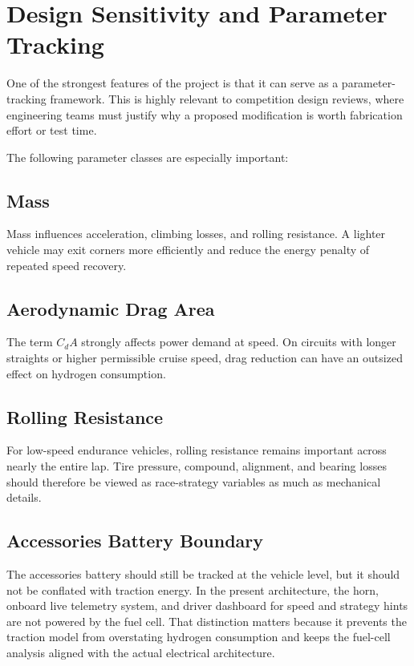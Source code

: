 \documentclass[11pt]{article}
\begin{document}
\section{Design Sensitivity and Parameter Tracking}

One of the strongest features of the project is that it can serve as a parameter-tracking framework. This is highly relevant to competition design reviews, where engineering teams must justify why a proposed modification is worth fabrication effort or test time.

The following parameter classes are especially important:

\subsection{Mass}

Mass influences acceleration, climbing losses, and rolling resistance. A lighter vehicle may exit corners more efficiently and reduce the energy penalty of repeated speed recovery.

\subsection{Aerodynamic Drag Area}

The term \(C_dA\) strongly affects power demand at speed. On circuits with longer straights or higher permissible cruise speed, drag reduction can have an outsized effect on hydrogen consumption.

\subsection{Rolling Resistance}

For low-speed endurance vehicles, rolling resistance remains important across nearly the entire lap. Tire pressure, compound, alignment, and bearing losses should therefore be viewed as race-strategy variables as much as mechanical details.

\subsection{Accessories Battery Boundary}

The accessories battery should still be tracked at the vehicle level, but it should not be conflated with traction energy. In the present architecture, the horn, onboard live telemetry system, and driver dashboard for speed and strategy hints are not powered by the fuel cell. That distinction matters because it prevents the traction model from overstating hydrogen consumption and keeps the fuel-cell analysis aligned with the actual electrical architecture.
\end{document}
